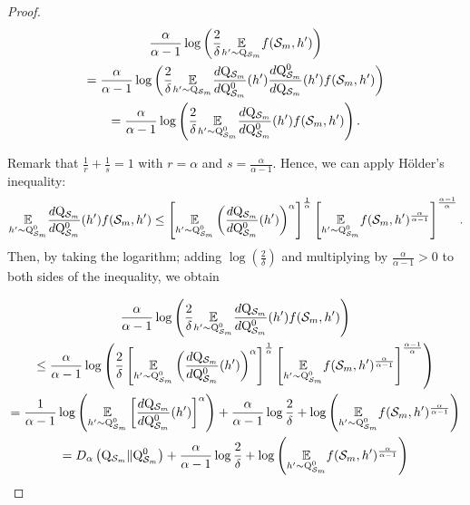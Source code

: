 \begin{proof}
\begin{multline*}
 \frac{\alpha}{\alpha-1} \log \left(\frac{2}{\delta} \underset{h^{\prime} \sim \mathrm{Q}_{\mathcal{S}_m}}{\mathbb{E}} f(\mathcal{S}_m,h')\right) \\ =\frac{\alpha}{\alpha-1} \log \left(\frac{2}{\delta} \underset{h^{\prime} \sim \mathrm{Q}_{\mathcal{S}_m}}{\mathbb{E}} \frac{d\mathrm{Q}_{\mathcal{S}_m}}{d\mathrm{Q}_{\mathcal{S}_m}^0}(h')\frac{d\mathrm{Q}_{\mathcal{S}_m}^0}{d\mathrm{Q}_{\mathcal{S}_m}}(h') f(\mathcal{S}_m,h') \right) \\
 =\frac{\alpha}{\alpha-1} \log \left(\frac{2}{\delta} \underset{h^{\prime} \sim \mathrm{Q}_{\mathcal{S}_m}^0}{\mathbb{E}} \frac{d\mathrm{Q}_{\mathcal{S}_m}}{d\mathrm{Q}_{\mathcal{S}_m}^0}(h') f(\mathcal{S}_m,h')\right) .
\end{multline*}

Remark that $\frac{1}{r}+\frac{1}{s}=1$ with $r=\alpha$ and $s=\frac{\alpha}{\alpha-1}$. Hence, we can apply Hölder's inequality:
$$
\underset{h^{\prime} \sim \mathrm{Q}_{\mathcal{S}_m}^0}{\mathbb{E}} \frac{d\mathrm{Q}_{\mathcal{S}_m}}{d\mathrm{Q}_{\mathcal{S}_m}^0}(h') f(\mathcal{S}_m,h') \leq\left[\underset{h^{\prime} \sim \mathrm{Q}_{\mathcal{S}_m}^0}{\mathbb{E}}\left(\frac{d\mathrm{Q}_{\mathcal{S}_m}}{d\mathrm{Q}_{\mathcal{S}_m}^0}(h')\right)^{\alpha}\right]^{\frac{1}{\alpha}}\left[\underset{h^{\prime} \sim \mathrm{Q}_{\mathcal{S}_m}^0}{\mathbb{E}} f(\mathcal{S}_m,h')^{\frac{\alpha}{\alpha-1}}\right]^{\frac{\alpha-1}{\alpha}} .
$$
Then, by taking the logarithm; adding $\log \left(\frac{2}{\delta}\right)$ and multiplying by $\frac{\alpha}{\alpha-1}>0$ to both sides of the inequality, we obtain

\begin{multline*}
\frac{\alpha}{\alpha-1} \log \left(\frac{2}{\delta} \underset{h^{\prime} \sim \mathrm{Q}_{\mathcal{S}_m}^0}{\mathbb{E}} \frac{d\mathrm{Q}_{\mathcal{S}_m}}{d\mathrm{Q}_{\mathcal{S}_m}^0}(h') f(\mathcal{S}_m,h')\right) \\
\leq \frac{\alpha}{\alpha-1} \log \left(\frac{2}{\delta}\left[\underset{h^{\prime} \sim \mathrm{Q}_{\mathcal{S}_m}^0}{\mathbb{E}}\left(\frac{d\mathrm{Q}_{\mathcal{S}_m}}{d\mathrm{Q}_{\mathcal{S}_m}^0}(h')\right)^{\alpha}\right]^{\frac{1}{\alpha}}\left[\underset{h^{\prime} \sim \mathrm{Q}_{\mathcal{S}_m}^0}{\mathbb{E}} f(\mathcal{S}_m,h')^{\frac{\alpha}{\alpha-1}}\right]^{\frac{\alpha-1}{\alpha}}\right) \\
 =\frac{1}{\alpha-1} \log \left(\underset{h^{\prime} \sim \mathrm{Q}_{\mathcal{S}_m}^0}{\mathbb{E}}\left[\frac{d\mathrm{Q}_{\mathcal{S}_m}}{d\mathrm{Q}_{\mathcal{S}_m}^0}(h')\right]^{\alpha}\right)+\frac{\alpha}{\alpha-1} \log \frac{2}{\delta}+\log \left(\underset{h^{\prime} \sim \mathrm{Q}_{\mathcal{S}_m}^0}{\mathbb{E}} f(\mathcal{S}_m,h')^{\frac{\alpha}{\alpha-1}}\right) \\
=D_{\alpha}\left(\mathrm{Q}_{\mathcal{S}_m} \| \mathrm{Q}_{\mathcal{S}_m}^0\right)+\frac{\alpha}{\alpha-1} \log \frac{2}{\delta}+\log \left(\underset{h^{\prime} \sim \mathrm{Q}_{\mathcal{S}_m}^0}{\mathbb{E}} f(\mathcal{S}_m,h')^{\frac{\alpha}{\alpha-1}}\right)
\end{multline*}


\end{proof}
